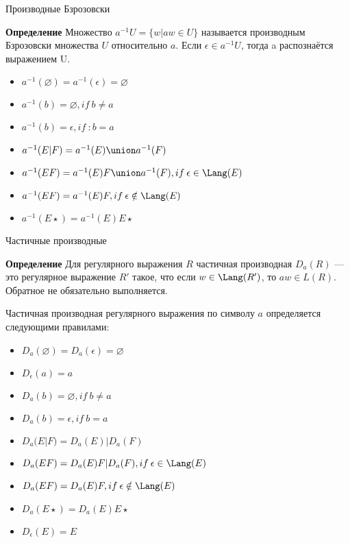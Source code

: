 \begin{frame}{Производные Бзрозовски}
    \vspace{-5pt}
    \begin{block}{\bf Определение}
    Множество $a^{-1} U = \{w | aw \in U\}$ называется производным Бзрозовски множества $U$ относительно $a$. Если $\epsilon \in a^{-1} U$, тогда a распознаётся выражением U.
    \end{block}
    \begin{itemize}
        \item $a^{-1}(\varnothing) = a^{-1}(\epsilon) = \varnothing$
        \item $a^{-1}(b) = \varnothing, if\:b \neq a$
        \item $a^{-1}(b) = \epsilon, if\ :b = a$
        \item $a^{-1}(E|F) = a^{-1}(E) \union a^{-1}(F)$
        \item $a^{-1}(EF) = a^{-1}(E)F \union a^{-1}(F), if \: \epsilon \in \Lang(E)$
        \item $a^{-1}(EF) = a^{-1}(E)F, if \: \epsilon \notin \Lang(E)$
        \item $a^{-1}(E \star ) = a^{-1}(E) E \star$
    \end{itemize}
\end{frame}
\begin{frame}{Частичные производные}
    \begin{block}{\bf Определение}
    Для регулярного выражения $R$ частичная производная $D_a(R)$ — это регулярное выражение $R'$ такое, что если $w \in \Lang(R')$, то $aw \in L(R)$. Обратное не обязательно выполняется.
    \end{block}
    Частичная производная регулярного выражения по символу $a$ определяется следующими правилами:
    \begin{itemize}
        \item $D_a(\varnothing) = D_a(\epsilon) = \varnothing$
        \item $D_\epsilon(a) = a$
        \item $D_a(b) = \varnothing, if\:b \neq a$
        \item $D_a(b) = \epsilon, if\:b = a$
        \item $D_a(E | F) = D_a(E) | D_a(F)$
        \item $D_a(EF) = D_a(E)F | D_a(F), if \: \epsilon \in \Lang(E)$
        \item $D_a(EF) = D_a(E)F, if \: \epsilon \notin \Lang(E)$
        \item $D_a(E \star ) = D_a(E) E \star$
        \item $D_\epsilon(E) = E$
    \end{itemize}
\end{frame} %
